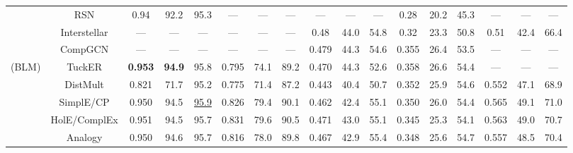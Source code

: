 \documentclass[10pt,journal,compsoc]{IEEEtran}
\begin{document}
\begin{table*}[ht]
\begin{tabular}{cc|ccc|ccc|ccc|ccc|ccc}
		&       RSN        &       0.94        &       92.2       &       95.3       &        ---        &       ---        &       ---        &        ---        &       ---        &       ---        &       0.28        &       20.2       &       45.3       &        ---        &       ---        &       ---        \\ 
		&       Interstellar        &       ---        &       ---       &       ---       &        ---        &       ---        &       ---        &        0.48        &       44.0        &       54.8       &       0.32        &       23.3       &       50.8       &        0.51        &      42.4        &       66.4        \\ 
		& CompGCN   &  --- & --- & --- & --- & --- & --- & 0.479 & 44.3 & 54.6 & 0.355 & 26.4 & 53.5 & --- & --- & --- \\ \midrule
		(BLM)  &   TuckER     &  \textbf{0.953}   &  \textbf{94.9}   &       95.8       &       0.795       &       74.1       &       89.2       &       0.470       & {44.3} &       52.6       & {0.358} & {26.6} &       54.4       &        ---        &       ---        &       ---        \\
		&                DistMult                 &       0.821       &       71.7       &       95.2       &       0.775       &       71.4       &       87.2       &       0.443       &       40.4       &       50.7       &      {0.352}      &       25.9       &       54.6       &       0.552       &       47.1       &       68.9       \\
		&                SimplE/CP                &       0.950       &       94.5       & \underline{95.9} &       0.826       & {79.4} &      {90.1}      &      {0.462}      &       42.4       &       55.1       &      {0.350}      &       26.0       &       54.4       &       0.565       & {49.1} &      {71.0}      \\ 
		&                HolE/ComplEx                 &       0.951       &       94.5       &       95.7       &  {0.831} &       79.6       & {90.5} &      {0.471}      &       43.0       &       55.1       &       0.345       &       25.3       &       54.1       & {0.563} & {49.0} &       70.7       \\
		&                 Analogy                 &       0.950       &       94.6       &       95.7       &       0.816       &       78.0       &   {89.8} &      {0.467}      &       42.9       &      {55.4}      &       0.348       &       25.6       & {54.7} &       0.557       &       48.5       & {70.4} \\

\end{tabular}
\end{table*}
\end{document}
